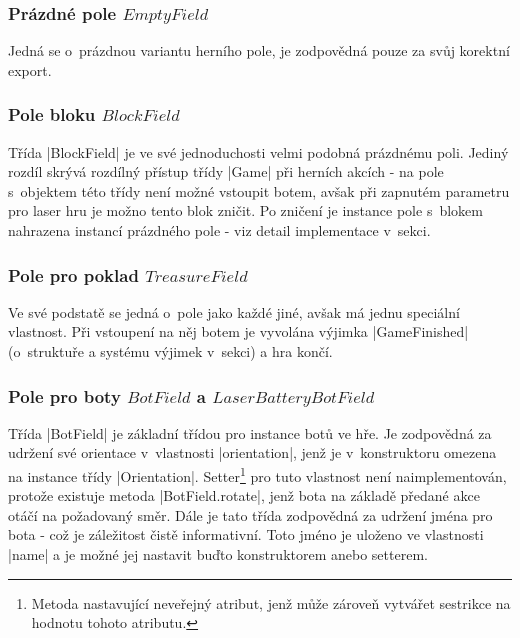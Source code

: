 \subsubsection{Prázdné pole $EmptyField$}

Jedná se o~prázdnou variantu herního pole, je zodpovědná pouze za svůj korektní export.

\subsubsection{Pole bloku $BlockField$}

Třída \ic|BlockField| je ve své jednoduchosti velmi podobná prázdnému poli. Jediný rozdíl skrývá rozdílný přístup třídy \ic|Game| při herních akcích - na pole s~objektem této třídy není možné vstoupit botem, avšak při zapnutém parametru pro laser hru je možno tento blok zničit. Po zničení je instance pole s~blokem nahrazena instancí prázdného pole - viz detail implementace v~sekci.

\subsubsection{Pole pro poklad $TreasureField$}

Ve své podstatě se jedná o~pole jako každé jiné, avšak má jednu speciální vlastnost. Při vstoupení na něj botem je vyvolána výjimka \ic|GameFinished| (o~struktuře a systému výjimek v~sekci) a hra končí. 

\subsubsection{Pole pro boty $BotField$ a $LaserBatteryBotField$}

Třída \ic|BotField| je základní třídou pro instance botů ve hře. Je zodpovědná za udržení své orientace v~vlastnosti \ic|orientation|, jenž je v~konstruktoru omezena na instance třídy \ic|Orientation|. Setter\footnote{Metoda nastavující neveřejný atribut, jenž může zároveň vytvářet sestrikce na hodnotu tohoto atributu.} pro tuto vlastnost není naimplementován, protože existuje metoda \ic|BotField.rotate|, jenž bota na základě předané akce otáčí na požadovaný směr. Dále je tato třída zodpovědná za udržení jména pro bota - což je záležitost čistě informativní. Toto jméno je uloženo ve vlastnosti \ic|name| a je možné jej nastavit buďto konstruktorem anebo setterem.

